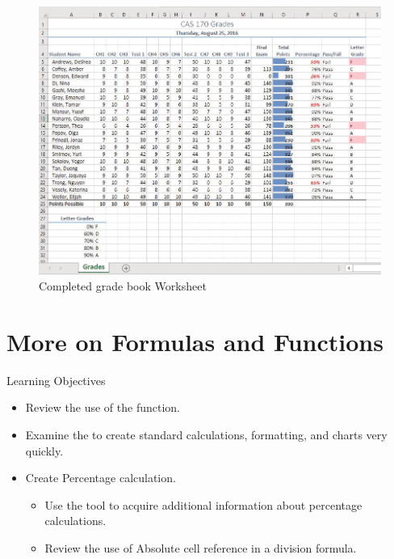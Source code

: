 \begin{figure}[H]
	\centering
	\includegraphics[width=\maxwidth{.95\linewidth}]{gfx/ch03_fig01}
	\caption{Completed grade book Worksheet}
	\label{03:fig01}
\end{figure}

\section{More on Formulas and Functions}

\begin{center}
	\begin{objbox}{Learning Objectives}
		\begin{itemize}
			\setlength{\itemsep}{0pt}
			\setlength{\parskip}{0pt}
			\setlength{\parsep}{0pt}
			
			\item Review the use of the  function.
			\item Examine the  to create standard calculations, formatting, and charts very quickly.
			\item Create Percentage calculation.

			\begin{itemize}
				\setlength{\itemsep}{0pt}
				\setlength{\parskip}{0pt}
				\setlength{\parsep}{0pt}

				\item Use the  tool to acquire additional information about percentage calculations.
				\item Review the use of Absolute cell reference in a division formula.
			\end{itemize}

		\end{itemize}
	\end{objbox}
\end{center}

